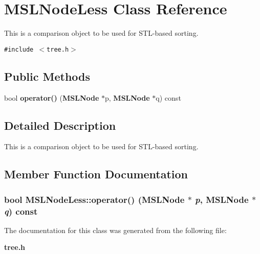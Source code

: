 \section{MSLNode\-Less  Class Reference}
\label{classMSLNodeLess}
This is a comparison object to be used for STL-based sorting. 


{\tt \#include $<$tree.h$>$}

\subsection*{Public Methods}
\begin{CompactItemize}
\item 
bool {\bf operator()} ({\bf MSLNode} $\ast$p, {\bf MSLNode} $\ast$q) const
\end{CompactItemize}


\subsection{Detailed Description}
This is a comparison object to be used for STL-based sorting.



\subsection{Member Function Documentation}
\subsubsection{\setlength{\rightskip}{0pt plus 5cm}bool MSLNode\-Less::operator() ({\bf MSLNode} $\ast$ {\em p}, {\bf MSLNode} $\ast$ {\em q}) const\hspace{0.3cm}{\tt  [inline]}}\label{classMSLNodeLess_a0}




The documentation for this class was generated from the following file:\begin{CompactItemize}
\item 
{\bf tree.h}\end{CompactItemize}
